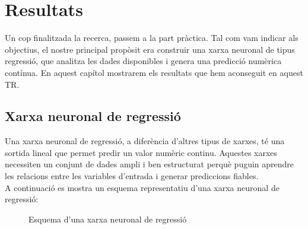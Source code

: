 \chapter{Resultats}
\label{c:Resultats}

Un cop finalitzada la recerca, passem a la part pràctica. Tal com vam indicar als objectius, el nostre principal propòsit era construir una xarxa neuronal de tipus regressió, que analitza les dades disponibles i genera una predicció numèrica contínua. En aquest capítol mostrarem els resultats que hem aconseguit en aquest TR.


\section{Xarxa neuronal de regressió}\label{sec:op}

Una xarxa neuronal de regressió, a diferència d’altres tipus de xarxes, té una sortida lineal que permet predir un valor numèric continu. Aquestes xarxes necessiten un conjunt de dades ampli i ben estructurat perquè puguin aprendre les relacions entre les variables d’entrada i generar prediccions fiables.\\[0.2cm]
A continuació es mostra un esquema representatiu d’una xarxa neuronal de regressió:

\begin{figure}[h!]
\centering
{}
\caption{Esquema d’una xarxa neuronal de regressió}
\end{figure}


